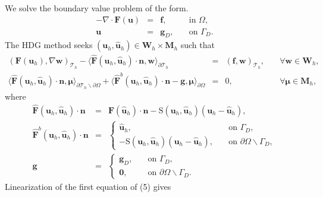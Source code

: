 \documentclass[11pt]{article}
\begin{document}
We solve the boundary value problem of the form.
\begin{equation}
\begin{array}{rcll}
- \nabla \cdot \bm{F} (\bm{u}) & = & \bm{f}, & \quad \mbox{in } \Omega, \\
\bm{u} & = & \bm{g}_D, & \quad \mbox{on } \Gamma_D .
\end{array}
\end{equation}
The HDG method seeks $(\bm{u}_h, \widehat{\bm{u}}_h) \in \bm{W}_h \times \bm{M}_h$ such that
\begin{equation}
\begin{array}{rcll}
(\bm{F} (\bm{u}_h), \nabla \bm{w})_{\mathcal{T}_h} - \langle \widehat{\bm{F}} (\bm{u}_h, \widehat{\bm{u}}_h) \cdot \bm{n}, \bm{w} \rangle_{\partial \mathcal{T}_h} & = & (\bm{f}, \bm{w})_{\mathcal{T}_h}, & \quad \forall \bm{w} \in \bm{W}_h, \\[2ex]
\langle \widehat{\bm{F}} (\bm{u}_h, \widehat{\bm{u}}_h) \cdot \bm{n}, \bm{\mu} \rangle_{\partial \mathcal{T}_h \backslash \partial \Omega} + \langle \widehat{\bm{F}}^b(\bm{u}_h, \widehat{\bm{u}}_h) \cdot \bm{n} - \bm{g}, \bm{\mu} \rangle_{\partial \Omega}  & = & 0, & \quad \forall \bm{\mu} \in \bm{M}_h ,
\end{array}
\end{equation}
where
\begin{equation}
\begin{array}{rcll}
\widehat{\bm{F}} (\bm{u}_h, \widehat{\bm{u}}_h) \cdot \bm{n} & = & {\bm{F}} (\widehat{\bm{u}}_h) \cdot \bm{n} - \bm{\mathrm{S}} (\bm{u}_h, \widehat{\bm{u}}_h) (\bm{u}_h - \widehat{\bm{u}}_h), \\[2ex]
\widehat{\bm{F}}^b(\bm{u}_h, \widehat{\bm{u}}_h) \cdot \bm{n} & = & 
\left\{
\begin{array}{ll} 
\widehat{\bm{u}}_h, & \quad  \mbox{on } \Gamma_D, \\
-\bm{\mathrm{S}} (\bm{u}_h, \widehat{\bm{u}}_h) (\bm{u}_h - \widehat{\bm{u}}_h), & \quad \mbox{on }  \partial \Omega \backslash \Gamma_D,  
\end{array}
\right. \\[3ex]
\bm{g} & = & 
\left\{
\begin{array}{ll} 
\bm{g}_D, & \quad  \mbox{on } \Gamma_D, \\
\bm{0}, & \quad \mbox{on }  \partial \Omega \backslash \Gamma_D .  
\end{array}
\right.
\end{array}
\end{equation}
Linearization of the first equation of (5) gives
\end{document}
